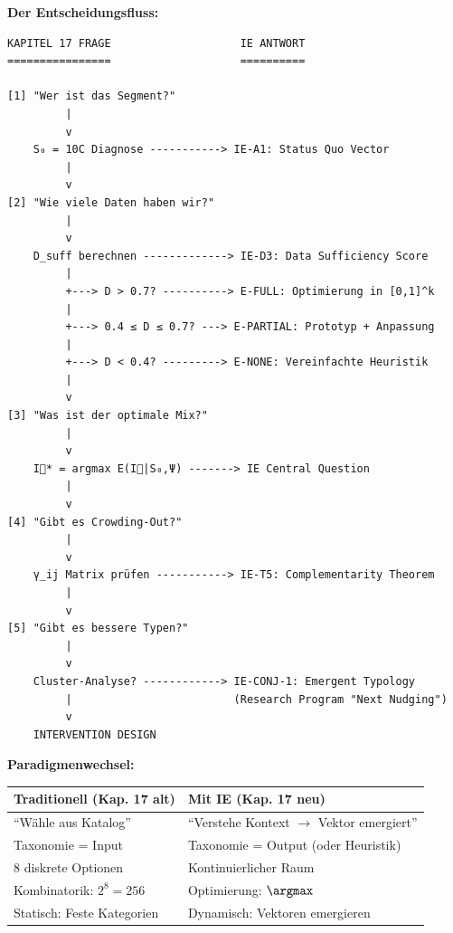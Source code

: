 \begin{tcolorbox}[colback=blue!5!white, colframe=blue!50!black,
    title=\textbf{Kapitel 17 Workflow $\to$ IE Konstrukte}]

\textbf{Der Entscheidungsfluss:}

\begin{verbatim}
KAPITEL 17 FRAGE                    IE ANTWORT
================                    ==========

[1] "Wer ist das Segment?"
         |
         v
    S₀ = 10C Diagnose -----------> IE-A1: Status Quo Vector
         |
         v
[2] "Wie viele Daten haben wir?"
         |
         v
    D_suff berechnen -------------> IE-D3: Data Sufficiency Score
         |
         +---> D > 0.7? ----------> E-FULL: Optimierung in [0,1]^k
         |
         +---> 0.4 ≤ D ≤ 0.7? ---> E-PARTIAL: Prototyp + Anpassung
         |
         +---> D < 0.4? ---------> E-NONE: Vereinfachte Heuristik
         |
         v
[3] "Was ist der optimale Mix?"
         |
         v
    I⃗* = argmax E(I⃗|S₀,Ψ) -------> IE Central Question
         |
         v
[4] "Gibt es Crowding-Out?"
         |
         v
    γ_ij Matrix prüfen -----------> IE-T5: Complementarity Theorem
         |
         v
[5] "Gibt es bessere Typen?"
         |
         v
    Cluster-Analyse? ------------> IE-CONJ-1: Emergent Typology
         |                         (Research Program "Next Nudging")
         v
    INTERVENTION DESIGN
\end{verbatim}

\textbf{Paradigmenwechsel:}
\begin{center}
\begin{tabular}{p{5cm}p{6cm}}
\toprule
\textbf{Traditionell (Kap. 17 alt)} & \textbf{Mit IE (Kap. 17 neu)} \\
\midrule
``Wähle aus Katalog'' & ``Verstehe Kontext $\to$ Vektor emergiert'' \\
Taxonomie = Input & Taxonomie = Output (oder Heuristik) \\
8 diskrete Optionen & Kontinuierlicher Raum \\
Kombinatorik: $2^8 = 256$ & Optimierung: $\argmax$ \\
Statisch: Feste Kategorien & Dynamisch: Vektoren emergieren \\
\bottomrule
\end{tabular}
\end{center}

\end{tcolorbox}


